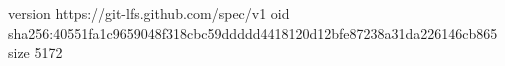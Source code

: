 version https://git-lfs.github.com/spec/v1
oid sha256:40551fa1c9659048f318cbc59ddddd4418120d12bfe87238a31da226146cb865
size 5172
